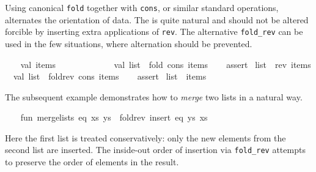 \begin{isabellebody}
\begin{isamarkuptext}
\begin{description}
  \end{description}%
\end{isamarkuptext}%
\isamarkuptrue%
%
\endisatagmlref
{\isafoldmlref}%
%
\isadelimmlref
%
\endisadelimmlref
%
\isadelimmlex
%
\endisadelimmlex
%
\isatagmlex
%
\begin{isamarkuptext}%
Using canonical \verb|fold| together with \verb|cons|, or
  similar standard operations, alternates the orientation of data.
  The is quite natural and should not be altered forcible by inserting
  extra applications of \verb|rev|.  The alternative \verb|fold_rev| can
  be used in the few situations, where alternation should be
  prevented.%
\end{isamarkuptext}%
\isamarkuptrue%
%
\endisatagmlex
{\isafoldmlex}%
%
\isadelimmlex
%
\endisadelimmlex
%
\isadelimML
%
\endisadelimML
%
\isatagML
{}\isamarkupfalse%
\ {\isacharverbatimopen}\isanewline
\ \ val\ items\ {\isacharequal}\ {\isacharbrackleft}{}{\isacharcomma}\ {}{\isacharcomma}\ {}{\isacharcomma}\ {}{\isacharcomma}\ {}{\isacharcomma}\ {}{\isacharcomma}\ {}{\isacharcomma}\ {}{\isacharcomma}\ {}{\isacharcomma}\ {}{}{\isacharbrackright}{\isacharsemicolon}\isanewline
\isanewline
\ \ val\ list{}\ {\isacharequal}\ fold\ cons\ items\ {\isacharbrackleft}{\isacharbrackright}{\isacharsemicolon}\isanewline
\ \ %
\isaantiq
assert%
\endisaantiq
\ {\isacharparenleft}list{}\ {\isacharequal}\ rev\ items{\isacharparenright}{\isacharsemicolon}\isanewline
\isanewline
\ \ val\ list{}\ {\isacharequal}\ fold{\isacharunderscore}rev\ cons\ items\ {\isacharbrackleft}{\isacharbrackright}{\isacharsemicolon}\isanewline
\ \ %
\isaantiq
assert%
\endisaantiq
\ {\isacharparenleft}list{}\ {\isacharequal}\ items{\isacharparenright}{\isacharsemicolon}\isanewline
{\isacharverbatimclose}%
\endisatagML
{\isafoldML}%
%
\isadelimML
%
\endisadelimML
%
\begin{isamarkuptext}%
The subsequent example demonstrates how to \emph{merge} two
  lists in a natural way.%
\end{isamarkuptext}%
\isamarkuptrue%
%
\isadelimML
%
\endisadelimML
%
\isatagML
{}\isamarkupfalse%
\ {\isacharverbatimopen}\isanewline
\ \ fun\ merge{\isacharunderscore}lists\ eq\ {\isacharparenleft}xs{\isacharcomma}\ ys{\isacharparenright}\ {\isacharequal}\ fold{\isacharunderscore}rev\ {\isacharparenleft}insert\ eq{\isacharparenright}\ ys\ xs{\isacharsemicolon}\isanewline
{\isacharverbatimclose}%
\endisatagML
{\isafoldML}%
%
\isadelimML
%
\endisadelimML
%
\begin{isamarkuptext}%
Here the first list is treated conservatively: only the new
  elements from the second list are inserted.  The inside-out order of
  insertion via \verb|fold_rev| attempts to preserve the order of
  elements in the result.


\end{isamarkuptext}
\end{isabellebody}
